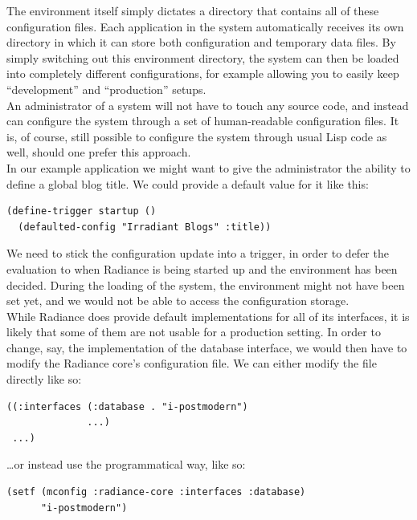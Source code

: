 \documentclass{sig-alternate}
\begin{document}
The environment itself simply dictates a directory that contains all of these configuration files. Each application in the system automatically receives its own directory in which it can store both configuration and temporary data files. By simply switching out this environment directory, the system can then be loaded into completely different configurations, for example allowing you to easily keep ``development'' and ``production'' setups. \\

An administrator of a system will not have to touch any source code, and instead can configure the system through a set of human-readable configuration files. It is, of course, still possible to configure the system through usual Lisp code as well, should one prefer this approach. \\

In our example application we might want to give the administrator the ability to define a global blog title. We could provide a default value for it like this:

\begin{verbatim}
(define-trigger startup ()
  (defaulted-config "Irradiant Blogs" :title))
\end{verbatim}

We need to stick the configuration update into a trigger, in order to defer the evaluation to when Radiance is being started up and the environment has been decided. During the loading of the system, the environment might not have been set yet, and we would not be able to access the configuration storage. \\

While Radiance does provide default implementations for all of its interfaces, it is likely that some of them are not usable for a production setting. In order to change, say, the implementation of the database interface, we would then have to modify the Radiance core's configuration file. We can either modify the file directly like so:

\begin{verbatim}
((:interfaces (:database . "i-postmodern")
              ...)
 ...)
\end{verbatim}

\dots or instead use the programmatical way, like so:

\begin{verbatim}
(setf (mconfig :radiance-core :interfaces :database)
      "i-postmodern")
\end{verbatim}
\end{document}
